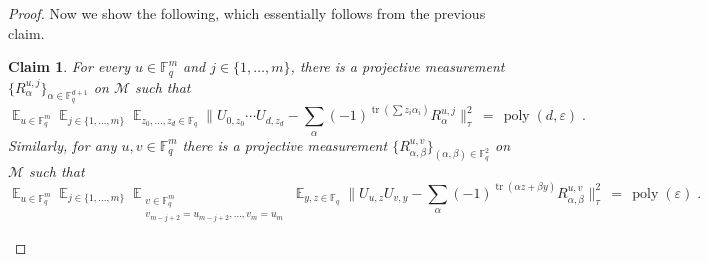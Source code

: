 \documentclass[11pt]{article}
\newtheorem{claim}[theorem]{Claim}
\theoremstyle{definition}
\DeclareMathOperator*{\Expectation}{\mathbb{E}}
\newcommand{\Es}[1]{\Expectation_{#1}}
\newcommand{\F}{\ensuremath{\mathbb{F}}}
\newcommand{\mM}{\ensuremath{\mathcal{M}}}
\DeclareMathOperator{\poly}{poly}
\newcommand{\eps}{\varepsilon}
\DeclareMathOperator{\tr}{tr}
\begin{document}
\begin{proof}
Now we show the following, which essentially follows from the previous claim. 

\begin{claim}\label{claim:z2-stab-3}
For every $u\in \F_q^m$ and $j\in\{1,\ldots,m\}$, there is a projective measurement $\{R^{u,j}_\alpha\}_{\alpha\in\F_q^{d+1}}$ on $\mM$ such that 
\[ \Es{u\in \F_q^m} \Es{j\in\{1,\ldots,m\}} \Es{z_0,\ldots,z_{d}\in \F_q} \Big\| U_{0,z_0}\cdots U_{d,z_d} -  \sum_{\alpha} (-1)^{\tr(\sum z_i\alpha_i)} R^{u,j}_\alpha\Big\|_\tau^2 \,=\, \poly(d,\eps)\;.\]
Similarly, for any $u,v\in \F_q^m$ there is a projective measurement $\{R^{u,v}_{\alpha,\beta}\}_{(\alpha,\beta)\in\F_q^{2}}$ on $\mM$ such that 
\[  \Es{u\in \F_q^m} \Es{j\in\{1,\ldots,m\}} \Es{\substack{v\in \F_q^m \\v_{m-j+2}=u_{m-j+2},\ldots,v_m=u_m}} \Es{y,z\in \F_q} \Big\| U_{u,z}  U_{v,y} -  \sum_{\alpha} (-1)^{ \tr(\alpha z + \beta y)} R^{u,v}_{\alpha,\beta}\Big\|_\tau^2 \,=\, \poly(\eps)\;.\]
\end{claim}


\end{proof}
\end{document}
